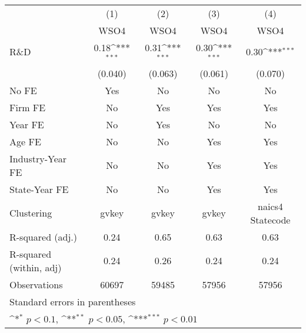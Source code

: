 {
\def\sym#1{\ifmmode^{#1}\else\(^{#1}\)\fi}
\begin{tabular}{l*{4}{c}}
\toprule
                    &\multicolumn{1}{c}{(1)}&\multicolumn{1}{c}{(2)}&\multicolumn{1}{c}{(3)}&\multicolumn{1}{c}{(4)}\\
                    &\multicolumn{1}{c}{WSO4}&\multicolumn{1}{c}{WSO4}&\multicolumn{1}{c}{WSO4}&\multicolumn{1}{c}{WSO4}\\
\midrule
R\&D                &        0.18\sym{***}&        0.31\sym{***}&        0.30\sym{***}&        0.30\sym{***}\\
                    &     (0.040)         &     (0.063)         &     (0.061)         &     (0.070)         \\
\addlinespace
No FE               &         Yes         &          No         &          No         &          No         \\
\addlinespace
Firm FE             &          No         &         Yes         &         Yes         &         Yes         \\
\addlinespace
Year FE             &          No         &         Yes         &          No         &          No         \\
\addlinespace
Age FE              &          No         &          No         &         Yes         &         Yes         \\
\addlinespace
Industry-Year FE    &          No         &          No         &         Yes         &         Yes         \\
\addlinespace
State-Year FE       &          No         &          No         &         Yes         &         Yes         \\
\midrule
Clustering          &       gvkey         &       gvkey         &       gvkey         &naics4 Statecode         \\
R-squared (adj.)    &        0.24         &        0.65         &        0.63         &        0.63         \\
R-squared (within, adj)&        0.24         &        0.26         &        0.24         &        0.24         \\
Observations        &       60697         &       59485         &       57956         &       57956         \\
\bottomrule
\multicolumn{5}{l}{\footnotesize Standard errors in parentheses}\\
\multicolumn{5}{l}{\footnotesize \sym{*} \(p<0.1\), \sym{**} \(p<0.05\), \sym{***} \(p<0.01\)}\\
\end{tabular}
}
